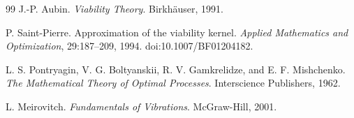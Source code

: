 \documentclass[11pt]{article}
\numberwithin{equation}{section}
\theoremstyle{definition}
\theoremstyle{remark}
\begin{document}
\begin{thebibliography}{99}
J.-P. Aubin.
\newblock \emph{Viability Theory}.
\newblock Birkh\"auser, 1991.

P. Saint-Pierre.
\newblock Approximation of the viability kernel.
\newblock \emph{Applied Mathematics and Optimization}, 29:187--209, 1994.
\newblock doi:10.1007/BF01204182.

L. S. Pontryagin, V. G. Boltyanskii, R. V. Gamkrelidze, and E. F. Mishchenko.
\newblock \emph{The Mathematical Theory of Optimal Processes}.
\newblock Interscience Publishers, 1962.

L. Meirovitch.
\newblock \emph{Fundamentals of Vibrations}.
\newblock McGraw-Hill, 2001.

\end{thebibliography}
\end{document}
